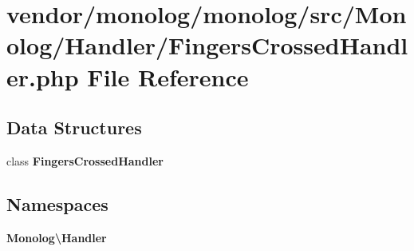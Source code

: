 \section{vendor/monolog/monolog/src/\+Monolog/\+Handler/\+Fingers\+Crossed\+Handler.php File Reference}
\label{_fingers_crossed_handler_8php}
\subsection*{Data Structures}
\begin{DoxyCompactItemize}
\item 
class {\bf Fingers\+Crossed\+Handler}
\end{DoxyCompactItemize}
\subsection*{Namespaces}
\begin{DoxyCompactItemize}
\item 
 {\bf Monolog\textbackslash{}\+Handler}
\end{DoxyCompactItemize}
